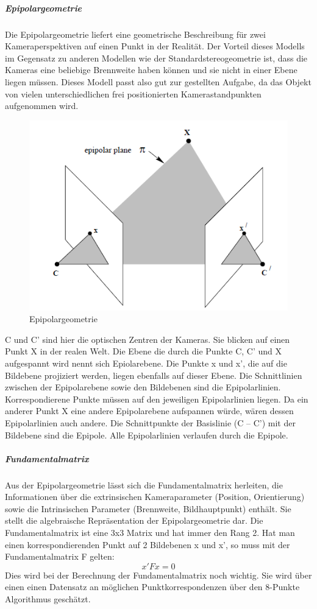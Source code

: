 \subparagraph{Epipolargeometrie}
Die Epipolargeometrie liefert eine geometrische Beschreibung für zwei Kameraperspektiven auf einen Punkt in der Realität. Der Vorteil dieses Modells im Gegensatz zu anderen Modellen wie der Standardstereogeometrie ist, dass die Kameras eine beliebige Brennweite haben können und sie nicht in einer Ebene liegen müssen. Dieses Modell passt also gut zur gestellten Aufgabe, da das Objekt von vielen unterschiedlichen frei positionierten Kamerastandpunkten aufgenommen wird.
\begin{figure}[ht]
    \centering
    \includegraphics[scale=0.75]{Figures/Epipolargeomtrie.PNG}
    \caption{Epipolargeometrie \cite{Richard2000}}
\end{figure}
C und C’ sind hier die optischen Zentren der Kameras. Sie blicken auf einen Punkt X in der realen Welt. Die Ebene die durch die Punkte C, C’ und X aufgespannt wird nennt sich Epiolarebene. Die Punkte x und x’, die auf die Bildebene projiziert werden, liegen ebenfalls auf dieser Ebene. Die Schnittlinien zwischen der Epipolarebene sowie den Bildebenen sind die Epipolarlinien. Korrespondierene Punkte müssen auf den jeweiligen Epipolarlinien liegen. Da ein anderer Punkt X eine andere Epipolarebene aufspannen würde, wären dessen Epipolarlinien auch andere. Die Schnittpunkte der Basislinie (C – C’) mit der Bildebene sind die Epipole. Alle Epipolarlinien verlaufen durch die Epipole. \cite{Richard2000}

\subparagraph{Fundamentalmatrix}
Aus der Epipolargeometrie lässt sich die Fundamentalmatrix herleiten, die Informationen über die extrinsischen Kameraparameter (Position, Orientierung) sowie die Intrinsischen Parameter (Brennweite, Bildhauptpunkt) enthält. Sie stellt die algebraische Repräsentation der Epipolargeometrie dar. Die Fundamentalmatrix ist eine 3x3 Matrix und hat immer den Rang 2. Hat man einen korrespondierenden Punkt auf 2 Bildebenen x und x’, so muss mit der Fundamentalmatrix F gelten:
$$x'Fx = 0$$
Dies wird bei der Berechnung der Fundamentalmatrix noch wichtig. Sie wird über einen einen Datensatz an möglichen Punktkorrespondenzen über den 8-Punkte Algorithmus geschätzt. \cite{Richard2000}

